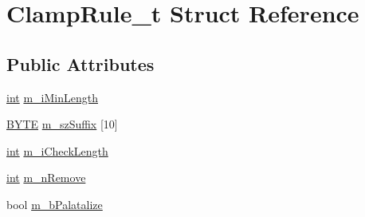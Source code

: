 \hypertarget{structClampRule__t}{\section{Clamp\-Rule\-\_\-t Struct Reference}
\label{structClampRule__t}
}
\subsection*{Public Attributes}
\begin{DoxyCompactItemize}
\item 
\hyperlink{sphinxexpr_8cpp_a4a26e8f9cb8b736e0c4cbf4d16de985e}{int} \hyperlink{structClampRule__t_a58c285ecff2df05758277aef3e958eb3}{m\-\_\-i\-Min\-Length}
\item 
\hyperlink{sphinxstd_8h_a4ae1dab0fb4b072a66584546209e7d58}{B\-Y\-T\-E} \hyperlink{structClampRule__t_a7b8b30efd58765f643e2bcfba2d7eb0a}{m\-\_\-sz\-Suffix} \mbox{[}10\mbox{]}
\item 
\hyperlink{sphinxexpr_8cpp_a4a26e8f9cb8b736e0c4cbf4d16de985e}{int} \hyperlink{structClampRule__t_a8f8b01cdf669feab5fa313adf41fd449}{m\-\_\-i\-Check\-Length}
\item 
\hyperlink{sphinxexpr_8cpp_a4a26e8f9cb8b736e0c4cbf4d16de985e}{int} \hyperlink{structClampRule__t_ad0e1a1374b12600cd690acb548f6232a}{m\-\_\-n\-Remove}
\item 
bool \hyperlink{structClampRule__t_a70d4aa610bcc938ca6adc611f60aeb21}{m\-\_\-b\-Palatalize}
\end{DoxyCompactItemize}


